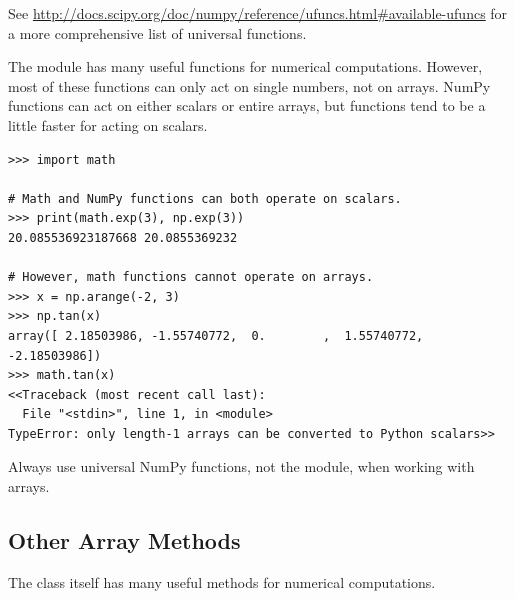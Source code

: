 See \url{http://docs.scipy.org/doc/numpy/reference/ufuncs.html#available-ufuncs} for a more comprehensive list of universal functions.

\begin{warn}
The  module has many useful functions for numerical computations.
However, most of these functions can only act on single numbers, not on arrays.
NumPy functions can act on either scalars or entire arrays, but  functions tend to be a little faster for acting on scalars.
\begin{lstlisting}
>>> import math

# Math and NumPy functions can both operate on scalars.
>>> print(math.exp(3), np.exp(3))
20.085536923187668 20.0855369232

# However, math functions cannot operate on arrays.
>>> x = np.arange(-2, 3)
>>> np.tan(x)
array([ 2.18503986, -1.55740772,  0.        ,  1.55740772, -2.18503986])
>>> math.tan(x)
<<Traceback (most recent call last):
  File "<stdin>", line 1, in <module>
TypeError: only length-1 arrays can be converted to Python scalars>>
\end{lstlisting}
Always use universal NumPy functions, not the  module, when working with arrays.
\end{warn}

\subsection*{Other Array Methods} %

The  class itself has many useful methods for numerical computations.

